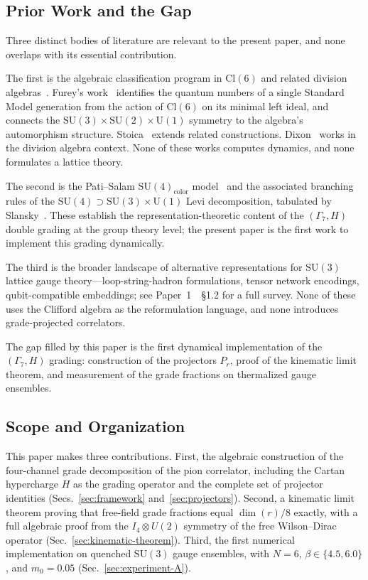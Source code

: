 \documentclass[12pt]{article}
\theoremstyle{definition}
\theoremstyle{remark}
\newcommand{\cl}{\mathrm{Cl}}           %
\newcommand{\su}{\mathrm{SU}}           %
\newcommand{\GaSeven}{\Gamma_7}                      %
\begin{document}
	\subsection{Prior Work and the Gap}
	\label{sec:priorwork}
	
	Three distinct bodies of literature are relevant to the present paper, and
	none overlaps with its essential contribution.
	
	The first is the algebraic classification program in $\cl(6)$ and related
	division algebras~\cite{Furey2012,Furey2014,Furey2015,Furey2018a,Furey2018b,
		Dixon1994,Stoica2018}.  Furey's
	work~\cite{Furey2012,Furey2014,Furey2015,Furey2018a,Furey2018b} identifies
	the quantum numbers of a single Standard Model generation from the action of
	$\cl(6)$ on its minimal left ideal, and connects the
	$\su(3)\times\su(2)\times\mathrm{U}(1)$ symmetry to the algebra's automorphism
	structure.  Stoica~\cite{Stoica2018} extends related constructions.
	Dixon~\cite{Dixon1994} works in the division algebra context.  None of these
	works computes dynamics, and none formulates a lattice theory.
	
	The second is the Pati--Salam $\su(4)_{\mathrm{color}}$
	model~\cite{PatiSalam1974} and the associated branching rules of the
	$\su(4)\supset\su(3)\times\mathrm{U}(1)$ Levi decomposition, tabulated by
	Slansky~\cite{Slansky1981}.  These establish the representation-theoretic
	content of the $(\GaSeven, H)$ double grading at the group theory level; the
	present paper is the first work to implement this grading dynamically.
	
	The third is the broader landscape of alternative representations for
	$\su(3)$ lattice gauge theory---loop-string-hadron formulations, tensor network
	encodings, qubit-compatible embeddings; see Paper~1~\cite{FirestoneP1}~\S1.2
	for a full survey.  None of these uses the Clifford algebra as the
	reformulation language, and none introduces grade-projected correlators.
	
	The gap filled by this paper is the first dynamical implementation of the
	$(\GaSeven, H)$ grading: construction of the projectors $P_r$, proof of the
	kinematic limit theorem, and measurement of the grade fractions on thermalized
	gauge ensembles.
	
	\subsection{Scope and Organization}
	\label{sec:scope}
	
	This paper makes three contributions.  First, the algebraic construction of
	the four-channel grade decomposition of the pion correlator, including the
	Cartan hypercharge $H$ as the grading operator and the complete set of
	projector identities (Secs.~\ref{sec:framework}
	and~\ref{sec:projectors}).  Second, a kinematic limit theorem proving that
	free-field grade fractions equal $\dim(r)/8$ exactly, with a full algebraic
	proof from the $I_4{\otimes}U(2)$ symmetry of the free Wilson--Dirac operator
	(Sec.~\ref{sec:kinematic-theorem}).  Third, the first numerical implementation
	on quenched $\su(3)$ gauge ensembles, with $N=6$, $\beta\in\{4.5,6.0\}$, and
	$m_0=0.05$ (Sec.~\ref{sec:experiment-A}).
	
\end{document}

